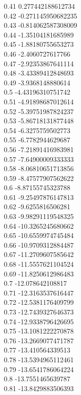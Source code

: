{0.41	0.277442188612734\\
0.42	-0.271145950682235\\
0.43	-0.814062587308009\\
0.44	-1.35104181685989\\
0.45	-1.88180755653273\\
0.46	-2.4060727617766\\
0.47	-2.92353867641114\\
0.48	-3.43389412848693\\
0.49	-3.9368148880614\\
0.5	-4.43196310751742\\
0.51	-4.91898687012614\\
0.52	-5.39751987824237\\
0.53	-5.86718131877448\\
0.54	-6.3275759502773\\
0.55	-6.7782944629687\\
0.56	-7.21891416983981\\
0.57	-7.64900009333333\\
0.58	-8.06810651713856\\
0.59	-8.47577907562622\\
0.6	-8.87155745323788\\
0.61	-9.25497876147813\\
0.62	-9.6255816506281\\
0.63	-9.98291119548325\\
0.64	-10.3265245680662\\
0.65	-10.6559974745484\\
0.66	-10.9709312884487\\
0.67	-11.2709607585642\\
0.68	-11.5557621104524\\
0.69	-11.8250612986483\\
0.7	-12.078642108817\\
0.71	-12.3163537616447\\
0.72	-12.5381176409799\\
0.73	-12.7439327646373\\
0.74	-12.9338796426695\\
0.75	-13.1081222270878\\
0.76	-13.2669077471787\\
0.77	-13.410564339513\\
0.78	-13.5394965112461\\
0.79	-13.6541786064224\\
0.8	-13.7551465639787\\
0.81	-13.8429883506393\\
}

